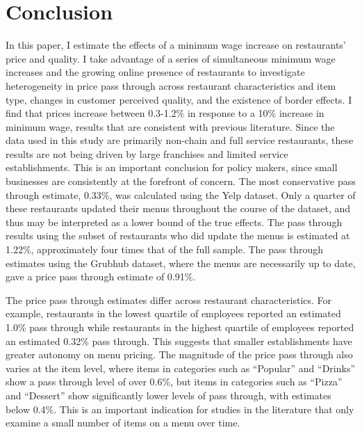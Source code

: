 \documentclass[11pt]{article}
\begin{document}
\section{Conclusion}
In this paper, I estimate the effects of a minimum wage increase on restaurants' price and quality. I take advantage of a series of simultaneous minimum wage increases and the growing online presence of restaurants to investigate heterogeneity in price pass through across restaurant characteristics and item type, changes in customer perceived quality, and the existence of border effects. I find that prices increase between 0.3-1.2\% in response to a 10\% increase in minimum wage, results that are consistent with previous literature. Since the data used in this study are primarily non-chain and full service restaurants, these results are not being driven by large franchises and limited service establishments. This is an important conclusion for policy makers, since small businesses are consistently at the forefront of concern. The most conservative pass through estimate, 0.33\%, was calculated using the Yelp dataset. Only a quarter of these restaurants updated their menus throughout the course of the dataset, and thus may be interpreted as a lower bound of the true effects. The pass through results using the subset of restaurants who did update the menus is estimated at 1.22\%, approximately four times that of the full sample. The pass through estimates using the Grubhub dataset, where the menus are necessarily up to date, gave a price pass through estimate of 0.91\%. 



The price pass through estimates differ across restaurant characteristics. For example, restaurants in the lowest quartile of employees reported an estimated 1.0\% pass through while restaurants in the highest quartile of employees reported an estimated 0.32\% pass through. This suggests that smaller establishments have greater autonomy on menu pricing. The magnitude of the price pass through also varies at the item level, where items in categories such as ``Popular'' and ``Drinks'' show a pass through level of over 0.6\%, but items in categories such as ``Pizza'' and ``Dessert'' show significantly lower levels of pass through, with estimates below 0.4\%. This is an important indication for studies in the literature that only examine a small number of items on a menu over time. 
\end{document}
